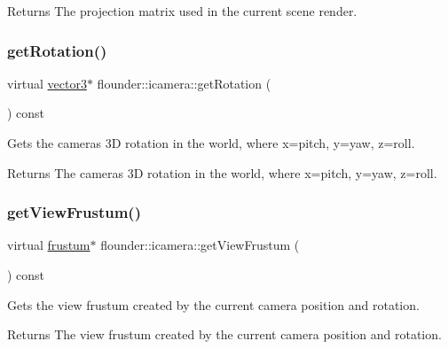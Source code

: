 \begin{DoxyReturn}{Returns}
The projection matrix used in the current scene render. 
\end{DoxyReturn}
\mbox{\label{classflounder_1_1icamera_a708d9b2cab040a78e522dc8a9864d959}} 
\subsubsection{\texorpdfstring{get\+Rotation()}{getRotation()}}
{\footnotesize\ttfamily virtual \hyperlink{classflounder_1_1vector3}{vector3}$\ast$ flounder\+::icamera\+::get\+Rotation (\begin{DoxyParamCaption}{ }\end{DoxyParamCaption}) const\hspace{0.3cm}{\ttfamily [pure virtual]}}



Gets the cameras 3D rotation in the world, where x=pitch, y=yaw, z=roll. 

\begin{DoxyReturn}{Returns}
The cameras 3D rotation in the world, where x=pitch, y=yaw, z=roll. 
\end{DoxyReturn}
\mbox{\label{classflounder_1_1icamera_a854ed7169c5514c18e0bb09e97dfcde6}} 
\subsubsection{\texorpdfstring{get\+View\+Frustum()}{getViewFrustum()}}
{\footnotesize\ttfamily virtual \hyperlink{classflounder_1_1frustum}{frustum}$\ast$ flounder\+::icamera\+::get\+View\+Frustum (\begin{DoxyParamCaption}{ }\end{DoxyParamCaption}) const\hspace{0.3cm}{\ttfamily [pure virtual]}}



Gets the view frustum created by the current camera position and rotation. 

\begin{DoxyReturn}{Returns}
The view frustum created by the current camera position and rotation. 
\end{DoxyReturn}
\mbox{\label{classflounder_1_1icamera_a95b93e33ce9d02b9ea23f7d7f9205d13}} 
